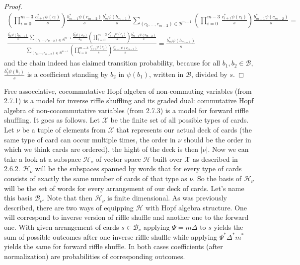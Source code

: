 \documentclass[a4paper, 12pt]{article}
\newcommand{\ndotsm}[3]{{#1}_{#2}, \dots, {#1}_{#3}}
\begin{document}
\begin{proof}
\begin{gather*}
{\left(\displaystyle\prod_{i = 0}^{m-3}\frac{c_{i+1}^*\psi(c_i)}{s}\right)\frac{b_{m-1}^*\psi(c_{m-2})}{s}
\frac{b_m^*\psi(b_{m-1})}{s}}{\displaystyle\sum_{(\ndotsm{c}{0}{m-2}) \in \mathcal{B}^{m-1}}
\left(\prod_{i= 0}^{m-3}\frac{c_{i+1}^*
\psi(c_i)}{s}\right)\frac{b_{m-1}^*\psi(c_{m-2})}{s}} = \\[16pt]
\frac{\frac{b_m^*\psi(b_{m-1})}{s}\displaystyle\sum_{(c_0, \dots, c_{m-2}) \in \mathcal{B}^{m-1}}
\frac{b_0^*\psi(x_0)}{s_0}
\left(\displaystyle\prod_{i = 0}^{m-3}\frac{c_{i+1}^*\psi(c_i)}{s}\right)\frac{b_{m-1}^*\psi(c_{m-2})}{s}}
{\displaystyle\sum_{(\ndotsm{c}{0}{m-2}) \in \mathcal{B}^{m-1}}\left(\prod_{i= 0}^{m-3}\frac{c_{i+1}^*
\psi(c_i)}{s}\right)\frac{b_{m-1}^*\psi(c_{m-2})}{s}} = \frac{b_m^*\psi(b_{m-1})}{s}
\end{gather*}
and the chain indeed has claimed transition probability, because for all $b_1, b_2 \in \mathcal{B}$,
 $\frac{b_2^*\psi(b_1)}{s}$ is a coefficient
standing by $b_2$ in $\psi(b_1)$, written in $\mathcal{B}$, divided by $s$.
\end{proof}

Free assocciative, cocommutative Hopf algebra of non-commuting variables (from 2.7.1) is a model for inverse
riffle shuffling and its graded dual: commutative
Hopf algebra of non-cocommutative variables (from 2.7.3) is a model for forward riffle shuffling.
It goes as follows.
Let $\mathcal{X}$ be the finite set of all possible types of cards. Let $\nu$ be a tuple of
elements from $\mathcal{X}$ that represents our actual deck of cards (the same type of card can occur
multiple times, the order in $\nu$ should be the order in which we think cards are ordered), the hight of
the deck is then $|\nu|$. Now we can take a look at a subspace $\mathcal{H}_\nu$ of vector space
$\mathcal{H}$ built over $\mathcal{X}$ as described in 2.6.2. $\mathcal{H}_\nu$ will be the subspaces
spanned by words that for every type of cards consists of exactly the same number of cards of that type as
$\nu$. So the basis of $\mathcal{H}_\nu$ will be the set of words for every arrangement of our deck of cards.
Let's name this basis $\mathcal{B}_\nu$. Note that then $\mathcal{H}_\nu$ is finite dimensional.
As was previously described, there are two ways of equipping $\mathcal{H}$ with Hopf algebra structure.
One will correspond to inverse version of riffle shuffle and another one to the forward one. With given
arrangement of cards $s \in \mathcal{B}_\nu$ applying $\Psi = m\Delta$ to $s$ yields the sum of possible outcomes
after one inverse riffle shuffle while applying $\Psi^*\Delta^*m^*$ yields the same for forward riffle shuffle.
In both cases coefficients (after normalization) are probabilities of corresponding outcomes. \\[4pt]
\end{document}
